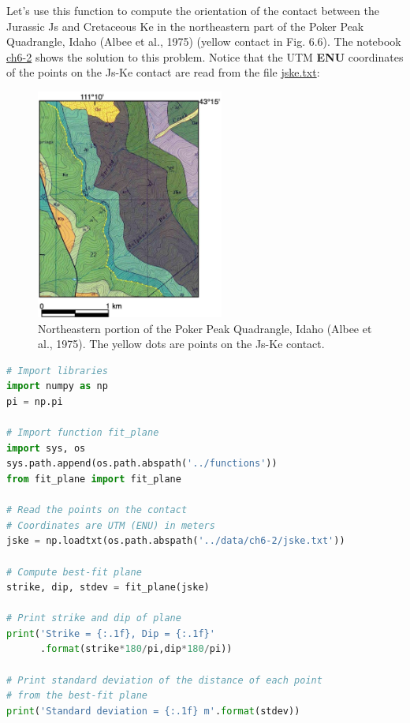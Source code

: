 \documentclass[a4paper , 12pt]{book}
\begin{document}
Let's use this function to compute the orientation of the contact between the Jurassic Js and Cretaceous Ke in the northeastern part of the Poker Peak Quadrangle, Idaho (Albee et al., 1975) (yellow contact in Fig. 6.6). The notebook \href{https://github.com/nfcd/compGeo/blob/master/source/notebooks/ch6-2.ipynb}{ch6-2} shows the solution to this problem. Notice that the UTM \textbf{ENU} coordinates of the points on the Js-Ke contact are read from the file \href{https://github.com/nfcd/compGeo/blob/master/source/data/ch6-2/jske.txt}{jske.txt}:

\begin{figure}
    \caption{Northeastern portion of the Poker Peak Quadrangle, Idaho (Albee et al., 1975). The yellow dots are points on the Js-Ke contact.}
    \includegraphics[width=0.55\textwidth]{ch6f7.pdf}
\end{figure}

\begin{center}
\begin{lstlisting}[language=Python, frame=single]
# Import libraries
import numpy as np
pi = np.pi

# Import function fit_plane
import sys, os
sys.path.append(os.path.abspath('../functions'))
from fit_plane import fit_plane

# Read the points on the contact
# Coordinates are UTM (ENU) in meters
jske = np.loadtxt(os.path.abspath('../data/ch6-2/jske.txt'))

# Compute best-fit plane
strike, dip, stdev = fit_plane(jske)

# Print strike and dip of plane
print('Strike = {:.1f}, Dip = {:.1f}'
      .format(strike*180/pi,dip*180/pi))

# Print standard deviation of the distance of each point
# from the best-fit plane
print('Standard deviation = {:.1f} m'.format(stdev))
\end{lstlisting}
\end{center}
\end{document}

